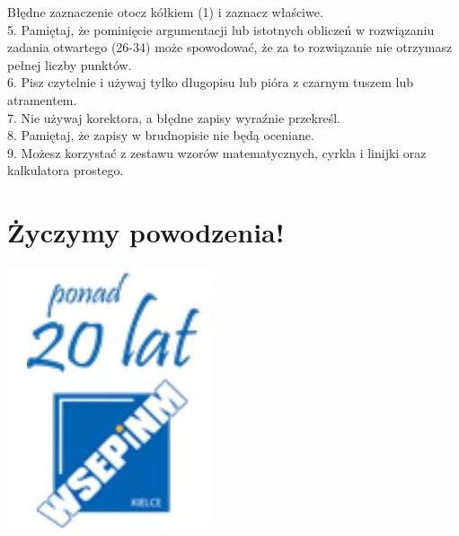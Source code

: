 \documentclass[10pt]{article}
\begin{document}
Błędne zaznaczenie otocz kółkiem (1) i zaznacz właściwe.\\
5. Pamiętaj, że pominięcie argumentacji lub istotnych obliczeń w rozwiązaniu zadania otwartego (26-34) może spowodować, że za to rozwiązanie nie otrzymasz pełnej liczby punktów.\\
6. Pisz czytelnie i używaj tylko długopisu lub pióra z czarnym tuszem lub atramentem.\\
7. Nie używaj korektora, a błędne zapisy wyraźnie przekreśl.\\
8. Pamiętaj, że zapisy w brudnopisie nie będą oceniane.\\
9. Możesz korzystać z zestawu wzorów matematycznych, cyrkla i linijki oraz kalkulatora prostego.

\section*{Życzymy powodzenia!}
\begin{center}
\includegraphics[max width=\textwidth]{2024_11_21_ba65d61981011633d840g-01}
\end{center}
\end{document}
